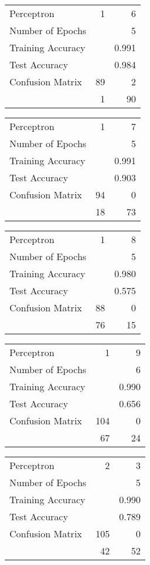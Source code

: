 \documentclass[11pt]{article}
\begin{document}
\begin{minipage}[t]{0.5\textwidth}
\begin{tabular}{|l | r r|}
\hline Perceptron & 1 & 6\\
Number of Epochs & & 5\\
Training Accuracy & & 0.991\\
Test Accuracy & & 0.984\\
Confusion Matrix & 89 & 2\\
 &1 & 90\\ \hline
\end{tabular}
\end{minipage}
\begin{minipage}[t]{0.5\textwidth}
\begin{tabular}{|l | r r|}
\hline Perceptron & 1 & 7\\
Number of Epochs & & 5\\
Training Accuracy & & 0.991\\
Test Accuracy & & 0.903\\
Confusion Matrix & 94 & 0\\
 &18 & 73\\ \hline
\end{tabular}
\end{minipage}
\begin{minipage}[t]{0.5\textwidth}
\begin{tabular}{|l | r r|}
\hline Perceptron & 1 & 8\\
Number of Epochs & & 5\\
Training Accuracy & & 0.980\\
Test Accuracy & & 0.575\\
Confusion Matrix & 88 & 0\\
 &76 & 15\\ \hline
\end{tabular}
\end{minipage}
\begin{minipage}[t]{0.5\textwidth}
\begin{tabular}{|l | r r|}
\hline Perceptron & 1 & 9\\
Number of Epochs & & 6\\
Training Accuracy & & 0.990\\
Test Accuracy & & 0.656\\
Confusion Matrix & 104 & 0\\
 &67 & 24\\ \hline
\end{tabular}
\end{minipage}
\begin{minipage}[t]{0.5\textwidth}
\begin{tabular}{|l | r r|}
\hline Perceptron & 2 & 3\\
Number of Epochs & & 5\\
Training Accuracy & & 0.990\\
Test Accuracy & & 0.789\\
Confusion Matrix & 105 & 0\\
 &42 & 52\\ \hline
\end{tabular}
\end{minipage}
\end{document}
